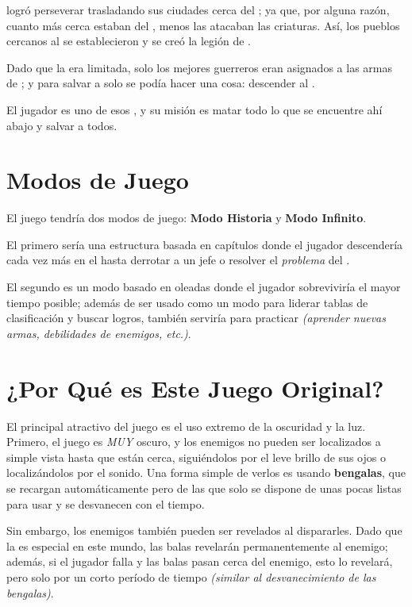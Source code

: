 \begin{multicols}{2}
    \humanity logró perseverar trasladando sus ciudades cerca del \hole; ya que, por alguna razón, cuanto más cerca estaban del \hole, menos las atacaban las criaturas. Así, los pueblos cercanos al \hole se establecieron y se creó la legión de \hunters.

    Dado que la \gunpowder era limitada, solo los mejores guerreros eran asignados a las armas de \gunpowder; y para salvar a \humanity solo se podía hacer una cosa: descender al \hole.

    El jugador es uno de esos \hunters, y su misión es matar todo lo que se encuentre ahí abajo y salvar a todos.


    \section{Modos de Juego}
    El juego tendría dos modos de juego: \textbf{Modo Historia} y \textbf{Modo Infinito}.

    El primero sería una estructura basada en capítulos donde el jugador descendería cada vez más en el \hole hasta derrotar a un jefe o resolver el \textit{problema} del \hole.

    El segundo es un modo basado en oleadas donde el jugador sobreviviría el mayor tiempo posible; además de ser usado como un modo para liderar tablas de clasificación y buscar logros, también serviría para practicar \textit{(aprender nuevas armas, debilidades de enemigos, etc.)}.


    \section{¿Por Qué es Este Juego Original?}
    El principal atractivo del juego es el uso extremo de la oscuridad y la luz. Primero, el juego es \textit{MUY} oscuro, y los enemigos no pueden ser localizados a simple vista hasta que están cerca, siguiéndolos por el leve brillo de sus ojos o localizándolos por el sonido. Una forma simple de verlos es usando \textbf{bengalas}, que se recargan automáticamente pero de las que solo se dispone de unas pocas listas para usar y se desvanecen con el tiempo.

    Sin embargo, los enemigos también pueden ser revelados al dispararles. Dado que la \gunpowder es especial en este mundo, las balas revelarán permanentemente al enemigo; además, si el jugador falla y las balas pasan cerca del enemigo, esto lo revelará, pero solo por un corto período de tiempo \textit{(similar al desvanecimiento de las bengalas)}.


\end{multicols}

